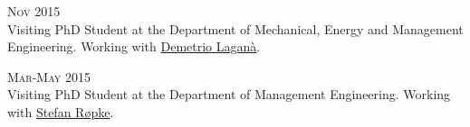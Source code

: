 \begin{paracol}{2}
  \textsc{Nov 2015}
\switchcolumn
  \\
  Visiting PhD Student at the Department of Mechanical, Energy and Management Engineering. Working with \href{https://scholar.google.com/citations?user=r_qFOqgAAAAJ}{Demetrio Laganà}.
\end{paracol}

\begin{paracol}{2}
  \textsc{Mar-May 2015}
\switchcolumn
  \\
  Visiting PhD Student at the Department of Management Engineering. Working with \href{https://scholar.google.com/citations?user=sYi141QAAAAJ}{Stefan Røpke}.
\end{paracol}

%

%
